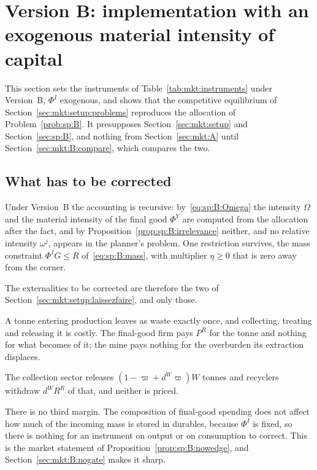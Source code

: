﻿\section{Version B: implementation with an exogenous material intensity of capital}\label{sec:mkt:B}

This section sets the instruments of Table~\ref{tab:mkt:instruments} under Version~B, $\Phi^I$
exogenous, and shows that the competitive equilibrium of Section~\ref{sec:mkt:setup:problems}
reproduces the allocation of Problem~\ref{prob:sp:B}. It presupposes Section~\ref{sec:mkt:setup} and
Section~\ref{sec:sp:B}, and nothing from Section~\ref{sec:mkt:A} until
Section~\ref{sec:mkt:B:compare}, which compares the two.


\subsection{What has to be corrected}\label{sec:mkt:B:what}

Under Version~B the accounting is recursive: by~\eqref{eq:sp:B:Omega} the intensity $\Omega$ and the
material intensity of the final good $\Phi^Y$ are computed from the allocation after the fact, and by
Proposition~\ref{prop:sp:B:irrelevance} neither, and no relative intensity $\omega^j$, appears in the
planner's problem. One restriction survives, the mass constraint $\Phi^IG\le R$
of~\eqref{eq:sp:B:mass}, with multiplier $\eta\ge0$ that is zero away from the corner.

The externalities to be corrected are therefore the two of
Section~\ref{sec:mkt:setup:laissezfaire}, and only those.

 A tonne entering production leaves as waste exactly once,
and collecting, treating and releasing it is costly. The final-good firm pays $P^R$ for the tonne and
nothing for what becomes of it; the mine pays nothing for the overburden its extraction displaces.

 The collection sector releases $\left(1-\varpi+d^W\varpi\right)W$ tonnes
and recyclers withdraw $d^WR^R$ of that, and neither is priced.

There is no third margin. The composition of final-good spending does not affect how much of the
incoming mass is stored in durables, because $\Phi^I$ is fixed, so there is nothing for an instrument
on output or on consumption to correct. This is the market statement of
Proposition~\ref{prop:sp:B:nowedge}, and Section~\ref{sec:mkt:B:nogate} makes it sharp.


